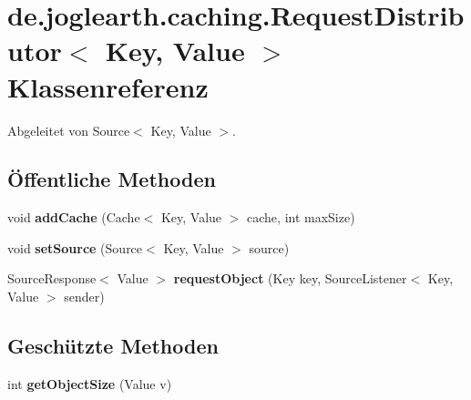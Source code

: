 \section{de.\-joglearth.\-caching.\-Request\-Distributor$<$ \-Key, \-Value $>$ \-Klassenreferenz}
\label{classde_1_1joglearth_1_1caching_1_1_request_distributor_3_01_key_00_01_value_01_4}


\-Abgeleitet von \-Source$<$ Key, Value $>$.

\subsection*{Öffentliche \-Methoden}
\begin{DoxyCompactItemize}
\item 
void {\bfseries add\-Cache} (\-Cache$<$ \-Key, \-Value $>$ cache, int max\-Size)\label{classde_1_1joglearth_1_1caching_1_1_request_distributor_3_01_key_00_01_value_01_4_aff8116b1acc6c6f135854bfa87808084}

\item 
void {\bfseries set\-Source} (\-Source$<$ \-Key, \-Value $>$ source)\label{classde_1_1joglearth_1_1caching_1_1_request_distributor_3_01_key_00_01_value_01_4_afc199efae4eaedbd0f1395985a94015f}

\item 
\-Source\-Response$<$ \-Value $>$ {\bfseries request\-Object} (\-Key key, \-Source\-Listener$<$ \-Key, \-Value $>$ sender)\label{classde_1_1joglearth_1_1caching_1_1_request_distributor_3_01_key_00_01_value_01_4_a5e44b1f023f4dbf7f6540b7de3a4eb2e}

\end{DoxyCompactItemize}
\subsection*{\-Geschützte \-Methoden}
\begin{DoxyCompactItemize}
\item 
int {\bfseries get\-Object\-Size} (\-Value v)\label{classde_1_1joglearth_1_1caching_1_1_request_distributor_3_01_key_00_01_value_01_4_ab109db4b6e2acdfb22a75cf84401d490}

\end{DoxyCompactItemize}
